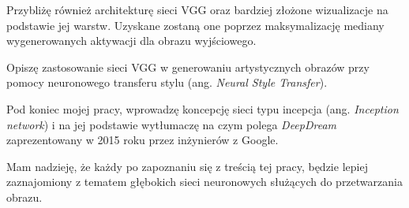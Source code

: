 Przybliżę również architekturę sieci VGG oraz bardziej złożone wizualizacje na podstawie jej warstw. Uzyskane zostaną one poprzez maksymalizację mediany wygenerowanych aktywacji dla obrazu wyjściowego.

Opiszę zastosowanie sieci VGG w generowaniu artystycznych obrazów przy pomocy neuronowego transferu stylu (ang. \textit{Neural Style Transfer}). 

Pod koniec mojej pracy, wprowadzę koncepcję sieci typu incepcja (ang. \textit{Inception network}) i na jej
podstawie wytłumaczę na czym polega \textit{DeepDream} zaprezentowany w 2015 roku przez inżynierów z Google.

Mam nadzieję, że każdy po zapoznaniu się z treścią tej pracy, będzie lepiej zaznajomiony z tematem głębokich sieci neuronowych służących do przetwarzania obrazu.
